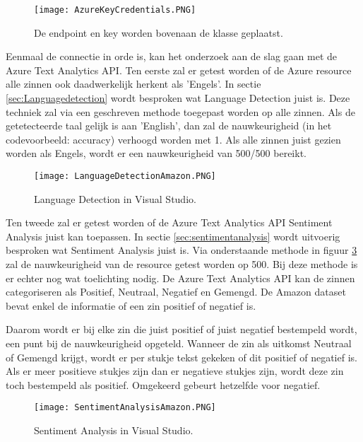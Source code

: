 \begin{figure}[!htbp]
    \texttt{[image: AzureKeyCredentials.PNG]}
    \caption{\label{azurecredentials}De endpoint en key worden bovenaan de klasse geplaatst.}
\end{figure}
\FloatBarrier

Eenmaal de connectie in orde is, kan het onderzoek aan de slag gaan met de Azure Text Analytics API. Ten eerste zal er getest worden of de Azure resource alle zinnen ook daadwerkelijk herkent als 'Engels'. In sectie \ref{sec:Languagedetection} wordt besproken wat Language Detection juist is. Deze techniek zal via een geschreven methode toegepast worden op alle zinnen. Als de getetecteerde taal gelijk is aan 'English', dan zal de nauwkeurigheid (in het codevoorbeeld: accuracy) verhoogd worden met 1. Als alle zinnen juist gezien worden als Engels, wordt er een nauwkeurigheid van 500/500 bereikt. 

\begin{figure}[!htbp]
    \texttt{[image: LanguageDetectionAmazon.PNG]}
    \caption{\label{azurelanguagedetectionamazon}Language Detection in Visual Studio.}
\end{figure}
\FloatBarrier

Ten tweede zal er getest worden of de Azure Text Analytics API Sentiment Analysis juist kan toepassen. In sectie \ref{sec:sentimentanalysis} wordt uitvoerig besproken wat Sentiment Analysis juist is. Via onderstaande methode in figuur \ref{azuresentimentanalysisamazon} zal de nauwkeurigheid van de resource getest worden op 500. Bij deze methode is er echter nog wat toelichting nodig. De Azure Text Analytics API kan de zinnen categoriseren als Positief, Neutraal, Negatief en Gemengd. De Amazon dataset bevat enkel de informatie of een zin positief of negatief is. 

Daarom wordt er bij elke zin die juist positief of juist negatief bestempeld wordt, een punt bij de nauwkeurigheid opgeteld. Wanneer de zin als uitkomst Neutraal of Gemengd krijgt, wordt er per stukje tekst gekeken of dit positief of negatief is. Als er meer positieve stukjes zijn dan er negatieve stukjes zijn, wordt deze zin toch bestempeld als positief. Omgekeerd gebeurt hetzelfde voor negatief. 

\begin{figure}[!htbp]
    \texttt{[image: SentimentAnalysisAmazon.PNG]}
    \caption{\label{azuresentimentanalysisamazon}Sentiment Analysis in Visual Studio.}
\end{figure}
\FloatBarrier

